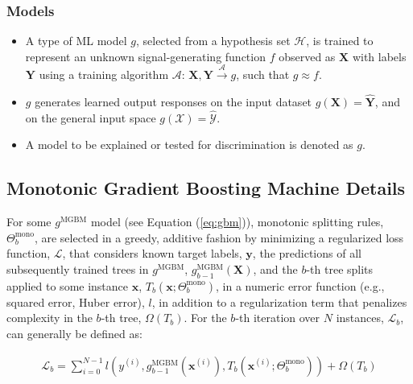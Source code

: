 \documentclass[information,article,accept,moreauthors,pdftex]{Definitions/mdpi}
\begin{document}
\subsubsection{Models}

\begin{itemize}[leftmargin=*,labelsep=5.8mm]
	\item A type of ML model $g$, selected from a hypothesis set $\mathcal{H}$, is trained to represent an unknown signal-generating function $f$ observed as  $\mathbf{X}$ with labels $\mathbf{Y}$ using a training algorithm $\mathcal{A}$: 
	$ \mathbf{X}, \mathbf{Y} \xrightarrow{\mathcal{A}} g$, such that $g \approx f$.
	\item $g$ generates learned output responses on the input dataset $g(\mathbf{X}) = \mathbf{\hat{Y}}$, and on the general input space $g(\mathcal{X}) = \mathcal{\hat{Y}}$.
	\item A model to be explained or tested for discrimination is denoted as $g$.
\end{itemize}

\subsection{Monotonic Gradient Boosting Machine Details}\label{a_ssec:mgbm}

 For some $g^\text{MGBM}$ model (see Equation (\ref{eq:gbm})), monotonic splitting rules, $\Theta^{\text{mono}}_b$, are selected in a greedy, additive fashion by minimizing a regularized loss function, $\mathcal{L}$,  that considers known target labels, $\mathbf{y}$, the predictions of all subsequently trained trees in $g^{\text{MGBM}}$, $g^{\text{MGBM}}_{b-1}(\mathbf{X})$, and the $b$-th tree splits applied to some instance $\mathbf{x}$, $T_b(\mathbf{x};\Theta^\text{mono}_b)$, in a numeric error function (e.g., squared error, Huber error), $l$, in addition to a regularization term that penalizes complexity in the $b$-th tree, $\Omega(T_b)$. For the $b$-th iteration over $N$ instances, $\mathcal{L}_{b}$, can generally be defined as:

\begin{equation}
\begin{aligned}
\mathcal{L}_{b} =\sum_{i=0}^{N-1}l(y^{(i)}, g^{\text{MGBM}}_{b-1}(\mathbf{x}^{(i)}), T_b(\mathbf{x}^{(i)};\Theta^\text{mono}_b)) + \Omega(T_b)\\
\end{aligned}
\end{equation}
\end{document}
